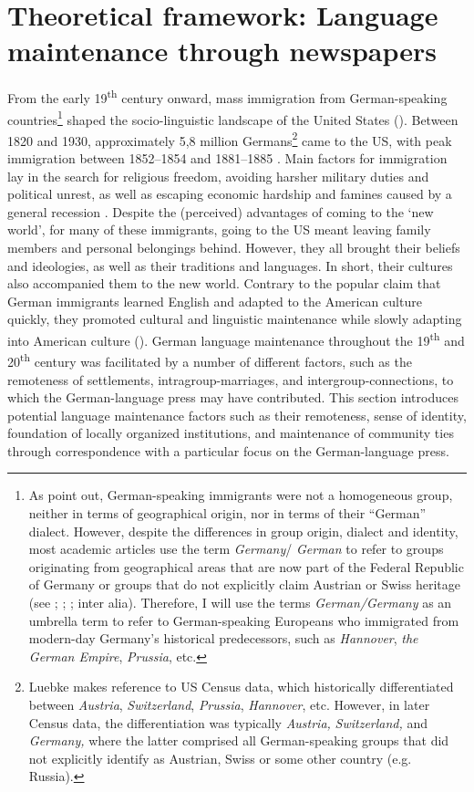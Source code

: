 \documentclass[output=paper]{langsci/langscibook}
\begin{document}
\section{Theoretical framework: Language maintenance through newspapers} %
\label{sec:rocker:2}

From the early 19\textsuperscript{th} century onward, mass immigration from German-speaking countries\footnote{As \citet[29]{PutnamSalmons2015} point out, German-speaking immigrants were not a homogeneous group, neither in terms of geographical origin, nor in terms of their “German” dialect. However, despite the differences in group origin, dialect and identity, most academic articles use the term \textit{Germany}/ \textit{German} to refer to groups originating from geographical areas that are now part of the Federal Republic of Germany or groups that do not explicitly claim Austrian or Swiss heritage (see \citealt{Schwartzkopff1987}; \citealt{Boas2002}; \citealt{PutnamSalmons2015}; inter alia). Therefore, I will use the terms \textit{German/Germany} as an umbrella term to refer to German-speaking Europeans who immigrated from modern-day Germany’s historical predecessors, such as \textit{Hannover}, \textit{the German Empire}, \textit{Prussia}, etc. } shaped the socio-linguistic landscape of the United States (\citealt{PutnamSalmons2015}). Between 1820 and 1930, approximately 5,8 million Germans\footnote{Luebke makes reference to US Census data, which historically differentiated between \textit{Austria}, \textit{Switzerland}, \textit{Prussia}, \textit{Hannover}, etc. However, in later Census data, the differentiation was typically \textit{Austria,} \textit{Switzerland,} and \textit{Germany,} where the latter comprised all German-speaking groups that did not explicitly identify as Austrian, Swiss or some other country (e.g. Russia).} came to the US, with peak immigration between 1852--1854 and 1881--1885 \citep[95]{Luebke1990}. Main factors for immigration lay in the search for religious freedom, avoiding harsher military duties and political unrest, as well as escaping economic hardship and famines caused by a general recession \citep[37]{Jacob2002}. Despite the (perceived) advantages of coming to the ‘new world’, for many of these immigrants, going to the US meant leaving family members and personal belongings behind. However, they all brought their beliefs and ideologies, as well as their traditions and languages. In short, their cultures also accompanied them to the new world. Contrary to the popular claim that German immigrants learned English and adapted to the American culture quickly, they promoted cultural and linguistic maintenance while slowly adapting into American culture (\citealt{WilkersonSalmons2008}). German language maintenance throughout the 19\textsuperscript{th} and 20\textsuperscript{th} century was facilitated by a number of different factors, such as the remoteness of settlements, intragroup-marriages, and intergroup-connections, to which the German-language press may have contributed. This section introduces potential language maintenance factors such as their remoteness, sense of identity, foundation of locally organized institutions, and maintenance of community ties through correspondence with a particular focus on the German-language press. 
\end{document}
